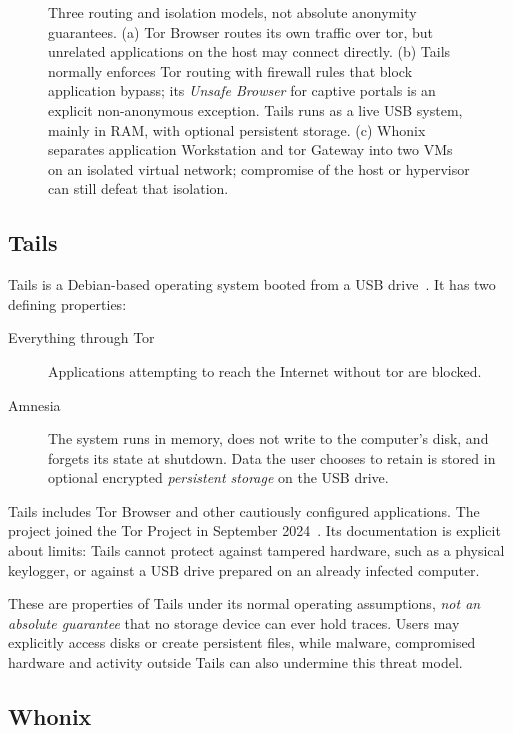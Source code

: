 \begin{figure}[htbp]
\centering

\caption{Three routing and isolation models, not absolute anonymity guarantees. (a) Tor Browser routes its own traffic over tor, but unrelated applications on the host may connect directly. (b) Tails normally enforces Tor routing with firewall rules that block application bypass; its \emph{Unsafe Browser} for captive portals is an explicit non-anonymous exception. Tails runs as a live USB system, mainly in RAM, with optional persistent storage. (c) Whonix separates application Workstation and tor Gateway into two VMs on an isolated virtual network; compromise of the host or hypervisor can still defeat that isolation.}
\label{fig:architetture}
\end{figure}

\subsection{Tails}

Tails is a Debian-based operating system booted from a USB drive~\cite{tailsabout}. It has two defining properties:
\begin{description}
  \item[Everything through Tor] Applications attempting to reach the Internet without tor are blocked.
  \item[Amnesia] The system runs in memory, does not write to the computer's disk, and forgets its state at shutdown. Data the user chooses to retain is stored in optional encrypted \emph{persistent storage} on the USB drive.
\end{description}
Tails includes Tor Browser and other cautiously configured applications. The project joined the Tor Project in September 2024~\cite{torblogtails}. Its documentation is explicit about limits: Tails cannot protect against tampered hardware, such as a physical keylogger, or against a USB drive prepared on an already infected computer.

These are properties of Tails under its normal operating assumptions, \emph{not an absolute guarantee} that no storage device can ever hold traces. Users may explicitly access disks or create persistent files, while malware, compromised hardware and activity outside Tails can also undermine this threat model.

\subsection{Whonix}

